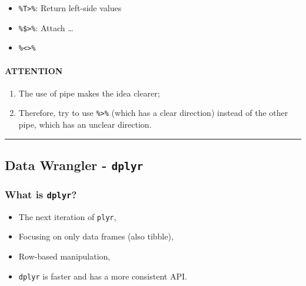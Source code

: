 \documentclass[
]{article}
\begin{document}
\begin{itemize}
\item
  \texttt{\%T\textgreater{}\%}: Return left-side values
\end{itemize}

\begin{itemize}
\item
  \texttt{\%\$\textgreater{}\%}: Attach \ldots{}
\end{itemize}

\begin{itemize}
\item
  \texttt{\%\textless{}\textgreater{}\%}
\end{itemize}

\hypertarget{attention}{%
\paragraph{\texorpdfstring{\textbf{ATTENTION}}{ATTENTION}}\label{attention}}

\begin{enumerate}
\def\labelenumi{\arabic{enumi}.}
\item
  The use of pipe makes the idea clearer;
\item
  Therefore, try to use \texttt{\%\textgreater{}\%} (which has a clear
  direction) instead of the other pipe, which has an unclear direction.
\end{enumerate}

\begin{center}\rule{0.5\linewidth}{0.5pt}\end{center}

\hypertarget{data-wrangler---dplyr}{%
\subsection{\texorpdfstring{Data Wrangler -
\texttt{dplyr}}{Data Wrangler - dplyr}}\label{data-wrangler---dplyr}}

\hypertarget{what-is-dplyr}{%
\subsubsection{\texorpdfstring{What is
\texttt{dplyr}?}{What is dplyr?}}\label{what-is-dplyr}}

\begin{itemize}
\item
  The next iteration of \texttt{plyr},
\item
  Focusing on only data frames (also tibble),
\item
  Row-based manipulation,
\item
  \texttt{dplyr} is faster and has a more consistent API.
\end{itemize}
\end{document}
